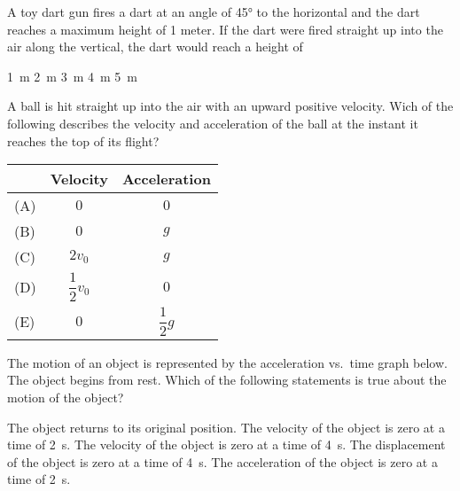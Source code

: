 \documentclass{../../../oss-ap12ibhl}
\begin{document}
\begin{questions}
  \question A toy dart gun fires a dart at an angle of \ang{45} to the
  horizontal and the dart reaches a maximum height of 1 meter. If the dart
  were fired straight up into the air along the vertical, the dart would
  reach a height of
  \begin{choices}
    \choice\SI{1}{\metre}
    \choice\SI{2}{\metre}
    \choice\SI{3}{\metre}
    \choice\SI{4}{\metre}
    \choice\SI{5}{\metre}
  \end{choices}

  \question A ball is hit straight up into the air with an upward positive
  velocity. Wich of the following describes the velocity and acceleration
  of the ball at the instant it reaches the top of its flight?
  
  \begin{tabular}{lcc}
    & Velocity & Acceleration\\ \hline
    (A) & $0$ & $0$\\
    (B) & $0$ & $g$\\
    (C) & $2v_0$ & $g$\\
    (D) & $\dfrac12v_0$ & $0$\\
    (E) & $0$ & $\dfrac12g$
  \end{tabular}
  
  \question The motion of an object is represented by the acceleration vs.\ time
  graph below. The object begins from rest. Which of the following statements
  is true about the motion of the object?

  \begin{minipage}{.3\linewidth}
  \end{minipage}
  \begin{minipage}{.6\linewidth}
    \begin{choices}
      \choice The object returns to its original position.
      \choice The velocity of the object is zero at a time of \SI{2}{\second}.
      \choice The velocity of the object is zero at a time of \SI{4}{\second}.
      \choice The displacement of the object is zero at a time of
      \SI{4}{\second}.
      \choice The acceleration of the object is zero at a time of
      \SI{2}{\second}.
    \end{choices}
  \end{minipage}
  \newpage
  

\end{questions}
\end{document}
